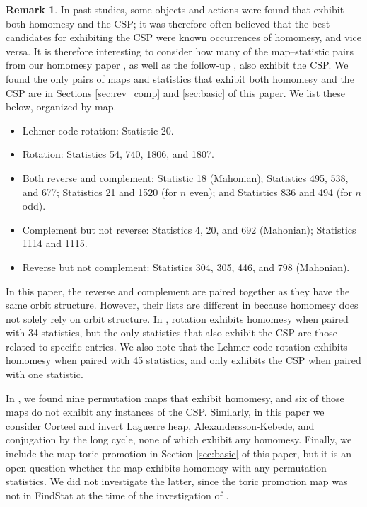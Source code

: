 \documentclass{amsart}
\theoremstyle{definition}
\newtheorem{remark}[thm]{Remark}
\begin{document}
\begin{remark}\label{rem:list_of_overlap} In past studies, some objects and actions were found that exhibit both homomesy and the CSP; it was therefore often believed that the best candidates for exhibiting the CSP were known occurrences of homomesy, and vice versa. 
It is therefore interesting to consider how
many of the map--statistic pairs from our homomesy paper \cite{ELMSW22}, as well as the follow-up \cite{dowling2023homomesy}, also exhibit the CSP.  We found the only pairs of maps and statistics that exhibit both homomesy and the CSP are in Sections \ref{sec:rev_comp} and \ref{sec:basic} of this paper. We list these below, organized by map.

\begin{itemize}
    \item Lehmer code rotation: Statistic 20.
    \item Rotation: Statistics 54, 740, 1806, and 1807.
    \item Both reverse and complement: Statistic 18 (Mahonian); Statistics 495, 538, and 677; Statistics 21 and 1520 (for $n$ even); and Statistics 836 and 494 (for $n$ odd).
    \item Complement but not reverse: 
 Statistics 4, 20, and 692 (Mahonian); Statistics 1114 and 1115.
    \item Reverse but not complement: 
 Statistics 304, 305, 446, and 798 (Mahonian).
\end{itemize}

  In this paper, the reverse and complement are paired together as they have the same orbit structure. However, their lists are different in \cite{ELMSW22} because homomesy does not solely rely on orbit structure. In \cite{dowling2023homomesy}, rotation exhibits homomesy when paired with 34 statistics, but the only statistics that also exhibit the CSP are those related to specific entries. We also note that the Lehmer code rotation exhibits homomesy when paired with 45 statistics, and only exhibits the CSP when paired with one statistic.

In \cite{ELMSW22}, we found nine permutation maps that exhibit homomesy, and six of those maps do not exhibit any instances of the CSP. Similarly, in this paper we consider Corteel and invert Laguerre heap, Alexandersson-Kebede, and conjugation by the long cycle, none of which exhibit any homomesy. Finally, we include the map toric promotion in Section \ref{sec:basic} of this paper, but it is an open question whether the map exhibits homomesy with any permutation statistics. We did not investigate the latter, since the toric promotion map was not in FindStat at the time of the investigation of \cite{ELMSW22}.
\end{remark}
\end{document}
